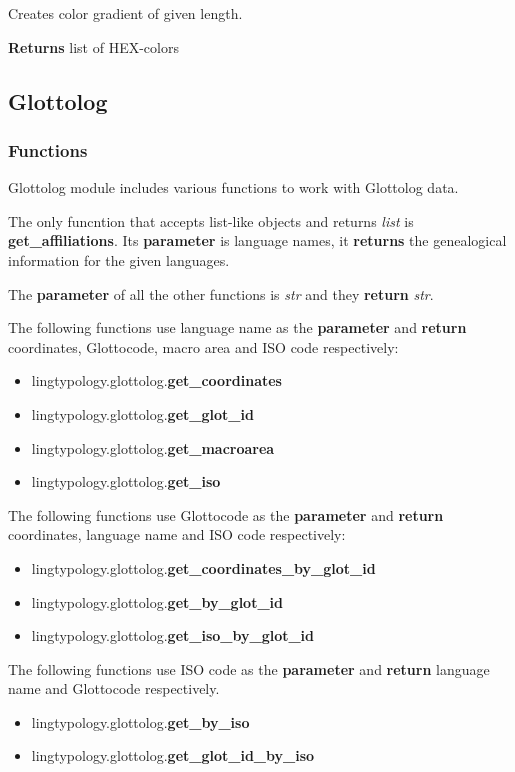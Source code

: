 \documentclass[a4paper,12pt]{article}
\begin{document}
Creates color gradient of given length.

\textbf{Returns} list of HEX-colors

\subsection{Glottolog}

\subsubsection{Functions}
Glottolog module includes various functions to work with Glottolog data.

The only funcntion that accepts list-like objects and returns \textit{list} is \textbf{get\_affiliations}. Its \textbf{parameter} is language names, it \textbf{returns} the genealogical information for the given languages.

The \textbf{parameter} of all the other functions is \textit{str} and they \textbf{return} \textit{str}.

The following functions use language name as the \textbf{parameter} and \textbf{return} coordinates, Glottocode, macro area and ISO code respectively:
\begin{itemize}
 \item lingtypology.glottolog.\textbf{get\_coordinates}
 \item lingtypology.glottolog.\textbf{get\_glot\_id}
 \item lingtypology.glottolog.\textbf{get\_macroarea}
 \item lingtypology.glottolog.\textbf{get\_iso}
\end{itemize}

The following functions use Glottocode as the \textbf{parameter} and \textbf{return} coordinates, language name and ISO code respectively:
\begin{itemize}
 \item lingtypology.glottolog.\textbf{get\_coordinates\_by\_glot\_id}
 \item lingtypology.glottolog.\textbf{get\_by\_glot\_id}
 \item lingtypology.glottolog.\textbf{get\_iso\_by\_glot\_id}
\end{itemize}

The following functions use ISO code as the \textbf{parameter} and \textbf{return} language name and Glottocode respectively.
\begin{itemize}
 \item lingtypology.glottolog.\textbf{get\_by\_iso}
 \item lingtypology.glottolog.\textbf{get\_glot\_id\_by\_iso}
\end{itemize}
\end{document}
